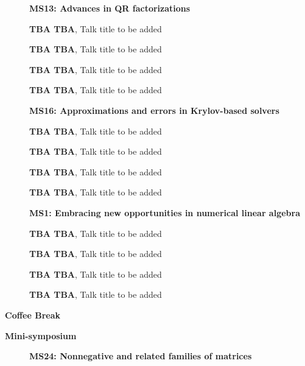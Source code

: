 \documentclass[ILAS2025-program.tex]{subfiles}
\begin{document}
\begin{description}
\begin{description}
    \item[] \textbf{MS13: Advances in QR factorizations} 
    \item[] \textbf{TBA TBA}, Talk title to be added
        \item[] \textbf{TBA TBA}, Talk title to be added
        \item[] \textbf{TBA TBA}, Talk title to be added
        \item[] \textbf{TBA TBA}, Talk title to be added
        \end{description}
    \begin{description}
    \item[] \textbf{MS16: Approximations and errors in Krylov-based solvers} 
    \item[] \textbf{TBA TBA}, Talk title to be added
        \item[] \textbf{TBA TBA}, Talk title to be added
        \item[] \textbf{TBA TBA}, Talk title to be added
        \item[] \textbf{TBA TBA}, Talk title to be added
        \end{description}
    \begin{description}
    \item[] \textbf{MS1: Embracing new opportunities in numerical linear algebra} 
    \item[] \textbf{TBA TBA}, Talk title to be added
        \item[] \textbf{TBA TBA}, Talk title to be added
        \item[] \textbf{TBA TBA}, Talk title to be added
        \item[] \textbf{TBA TBA}, Talk title to be added
        \end{description}
    \item[\info{15:30\textrm{--}16:00}] \textbf{Coffee Break} 
    \item[\info{16:00\textrm{--}18:00}] \textbf{Mini-symposium} 
    \begin{description}
    \item[] \textbf{MS24: Nonnegative and related families of matrices} 

\end{description}
\end{description}
\end{document}
